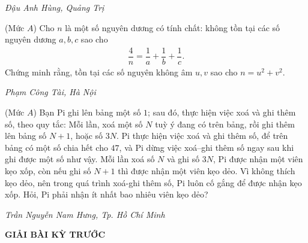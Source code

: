 \begin{multicols}{2}
\begin{figure}[H]
		\vspace*{-15pt}
	\end{figure}
	\begin{flushright}
		\textit{Đậu Anh Hùng, Quảng Trị}
	\end{flushright}
	{}
	(Mức $A$) Cho $n$ là một số nguyên dương có tính chất: không tồn tại các số nguyên dương $a,b,c$ sao cho 
	\begin{align*}
		\dfrac4n=\dfrac 1a+\dfrac 1b+\dfrac 1c.
	\end{align*}
	Chứng minh rằng, tồn tại các số nguyên không âm $u,v$ sao cho $n=u^2+v^2$.  
	\begin{flushright}
		\textit{Phạm Công Tài, Hà Nội}
	\end{flushright}
	{}
	(Mức $A$) Bạn Pi ghi lên bảng một số $1$; sau đó, thực hiện việc xoá và ghi thêm số, theo quy tắc:  Mỗi lần, xoá một số $N$ tuỳ ý đang có trên bảng, rồi ghi thêm lên bảng số $N+1$,  hoặc số $3N$.
	\vskip 0.05cm
	Pi thực hiện việc xoá và ghi thêm số, để trên bảng có một số chia hết cho $47$, và Pi dừng việc xoá--ghi thêm số ngay sau khi ghi được một số như vậy. 
	\vskip 0.05cm
	Mỗi lần xoá số $N$ và ghi số $3N$, Pi được nhận một viên kẹo xốp, còn nếu ghi số $N+1$ thì được nhận một viên kẹo dẻo. Vì không thích kẹo dẻo, nên trong quá trình xoá-ghi thêm số, Pi luôn cố gắng để được nhận kẹo xốp. Hỏi, Pi phải nhận ít nhất bao nhiêu viên kẹo dẻo? 
	\begin{flushright}
		\textit{Trần Nguyễn Nam Hưng, Tp. Hồ Chí Minh}
	\end{flushright}
\end{multicols}
\begin{center}
	{\large{\textbf{\color{thachthuctoanhoc}GIẢI BÀI KỲ TRƯỚC}}}
\end{center}

